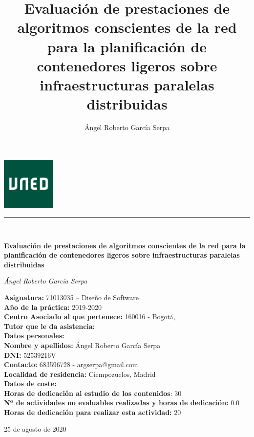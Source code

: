 \documentclass[a4paper]{article}
\title{Evaluación de prestaciones de algoritmos conscientes de la red para la planificación de contenedores ligeros sobre infraestructuras paralelas distribuidas } %
\author{Ángel Roberto García Serpa} %
\newcommand{\HRule}[1]{\rule{\linewidth}{#1}}
\begin{document}
		\begin{titlepage}
		\centering
		
		\vspace{3.5cm}
		
		\includegraphics[width=0.2\textwidth]{graphics/logo_uned}
		
		\vspace{3.5cm}
		
		
		\HRule{3pt} \\ [0.5cm]
		
		{\huge\bfseries Evaluación de prestaciones de algoritmos conscientes de la red para la planificación de contenedores ligeros sobre infraestructuras paralelas distribuidas\par}
		\vspace{4cm}
		{\Large\itshape Ángel Roberto García Serpa\par}
		\vspace{4cm}
		\begin{flushleft}
			
		
		\textbf{Asignatura:} 71013035 – Diseño de Software\\
		\textbf{Año de la práctica:} 2019-2020\\
		\textbf{Centro Asociado al que pertenece:} 160016 - Bogotá,\\
		\textbf{Tutor que le da asistencia:}\\ 
		\textbf{Datos personales:}\\ 
		\textbf{Nombre y apellidos:} Ángel Roberto García Serpa\\
		\textbf{DNI:} 52539216V\\
		\textbf{Contacto:} 683596728 - argserpa@gmail.com\\
		\textbf{Localidad de residencia:} Ciempozuelos, Madrid\\
		\textbf{Datos de coste:}\\
  		\textbf{Horas de dedicación al estudio de los contenidos}:  30\\
		\textbf{Nº de actividades no evaluables realizadas y horas de dedicación:} 0.0\\
		\textbf{Horas de dedicación para realizar esta actividad:}  20\\
	\end{flushleft}		
		\vfill		
		{\large 25 de agosto de 2020\par}
	\end{titlepage}
\end{document}
